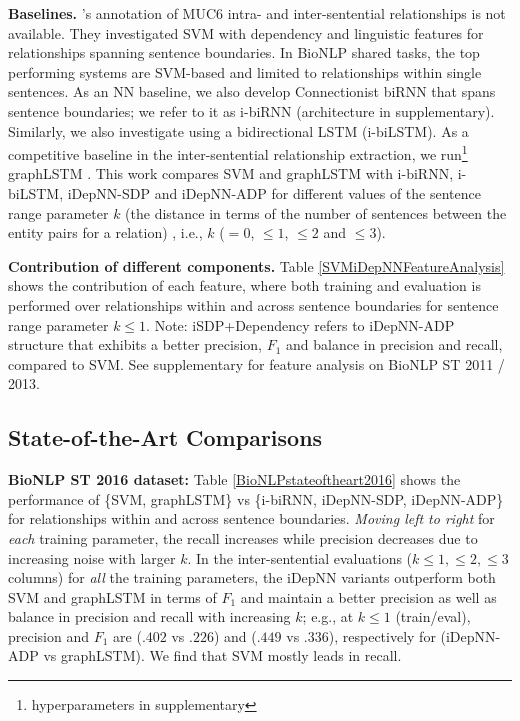 \documentclass[letterpaper]{article} \usepackage{aaai19}  \usepackage{times}  \usepackage{helvet}  \usepackage{courier}  \usepackage{url}  \usepackage{graphicx}
\begin{document}
\textbf{Baselines.}
\citeauthor{swampillai2010inter}'s  
annotation of MUC6 intra- and inter-sentential relationships
is not available.
They investigated SVM with dependency and linguistic features for relationships spanning sentence boundaries. 
In BioNLP shared tasks, the top performing systems are SVM-based and limited to relationships within single sentences.   
As an NN baseline, we also develop Connectionist biRNN \cite{vu2016combining} that spans sentence boundaries; 
we refer to it as i-biRNN (architecture in  supplementary). Similarly, we also investigate using a bidirectional LSTM (i-biLSTM). 
As a competitive baseline in the inter-sentential relationship extraction, we run\footnote{hyperparameters in supplementary} graphLSTM \cite{peng2017cross}.   
This work compares SVM and graphLSTM with i-biRNN, i-biLSTM, iDepNN-SDP and iDepNN-ADP for different values of the sentence range parameter $k$  (the distance in terms of the number of sentences between the entity pairs for a relation) , i.e., 
$k$ ($=0$, $\le 1$, $\le 2$ and $\le 3$).  
\iffalse
1.	BB event  corpus statistics
http://2016.bionlp-st.org/tasks/bb2/bb3-corpus

Num of gold predictions(Tp +fn) = 340

Tp = predictions * precision
Fp = pred - TP
FN = gold (340) - TP

Recall = tp/(tp + fn)
Num of gold predictions(Tp +fn)=  tp/recall                                            
\fi



\textbf{Contribution of different components.}
Table \ref{SVMiDepNNFeatureAnalysis} shows the contribution of each feature, where both training and evaluation is performed over relationships within and across sentence boundaries for sentence range parameter $k$$\le$$1$. Note: iSDP+Dependency refers to iDepNN-ADP structure that exhibits  a better precision, $F_1$ and balance in precision and recall, compared to SVM. 
See supplementary  for feature analysis on BioNLP ST 2011 / 2013.

\subsection{State-of-the-Art Comparisons}
{\bf BioNLP ST 2016 dataset:}
Table \ref{BioNLPstateoftheart2016} shows the performance
of \{SVM, graphLSTM\} vs \{i-biRNN, iDepNN-SDP, iDepNN-ADP\}
for relationships within and across sentence boundaries.
{\it Moving left to right} for {\it each} training parameter, the recall increases while precision decreases due to  
increasing noise with larger $k$.   
In the inter-sentential evaluations ($k \le 1, \le 2, \le3$ columns) for {\it all} 
the training parameters, the iDepNN variants outperform both SVM and graphLSTM in terms of $F_1$ and  maintain a better precision as well as balance 
in precision and recall with increasing $k$; e.g., 
 at $k \le 1$ (train/eval),  precision and $F_1$ are  
($.402$ vs $.226$) and ($.449$ vs $.336$), respectively for (iDepNN-ADP vs graphLSTM).   
We find that SVM mostly leads in recall.  
\end{document}
